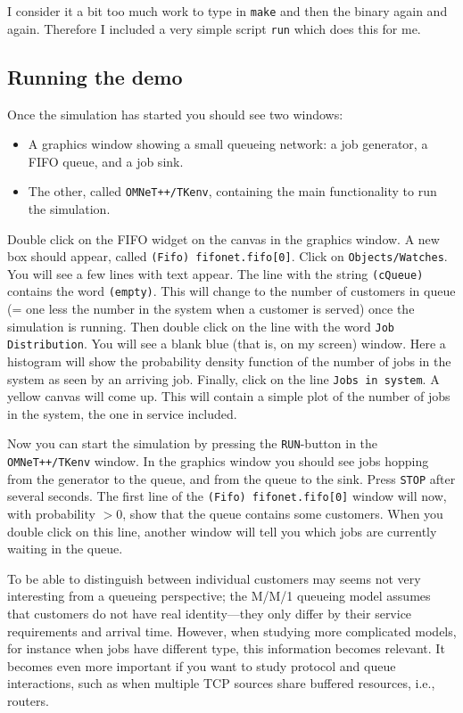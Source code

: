 \documentclass[a4paper]{article}
\begin{document}
I consider it a bit too much work to type in \texttt{make} and then
the binary  again and again. Therefore I included a very
simple script \texttt{run} which does this for me.

\subsection{Running the demo}
\label{sec:running-simulation}
Once the simulation has started you should see two windows:
\begin{itemize}
\item A graphics window showing a small queueing network: a job
  generator, a FIFO queue, and a job sink.
\item The other, called \texttt{OMNeT++/TKenv}, containing the main  functionality to
  run the simulation.
\end{itemize}

Double click on the FIFO widget on the canvas in the graphics window.
A new box should appear, called \texttt{(Fifo) fifonet.fifo[0]}. Click
on \texttt{Objects/Watches}.  You will see a few lines with text
appear. The line with the string \texttt{(cQueue)} contains the word
\texttt{(empty)}.  This will change to the number of customers in
queue (= one less the number in the system when a customer is served)
once the simulation is running.  Then double click on the line with
the word \texttt{Job Distribution}.  You will see a blank blue (that
is, on my screen) window. Here a histogram will show the probability
density function of the number of jobs in the system as seen by an
arriving job. Finally, click on the line \texttt{Jobs in system}. A
yellow canvas will come up. This will contain a simple plot of the
number of jobs in the system, the one in service included.

Now you can start the simulation by pressing the \texttt{RUN}-button
in the \texttt{OMNeT++/TKenv} window. In the graphics window you
should see jobs hopping from the generator to the queue, and from the
queue to the sink.  Press \texttt{STOP} after several seconds. The
first line of the \texttt{(Fifo) fifonet.fifo[0]} window will now,
with probability $ > 0$, show that the queue contains some customers.
When you double click on this line, another window will tell you which
jobs are currently waiting in the queue.

To be able to distinguish between individual customers may seems not
very interesting from a queueing perspective; the M/M/1 queueing model
assumes that customers do not have real identity---they only differ by
their service requirements and arrival time. However, when studying
more complicated models, for instance when jobs have different type,
this information becomes relevant. It becomes even more important if
you want to study protocol and queue interactions, such as when
multiple TCP sources share buffered resources, i.e., routers.
\end{document}
